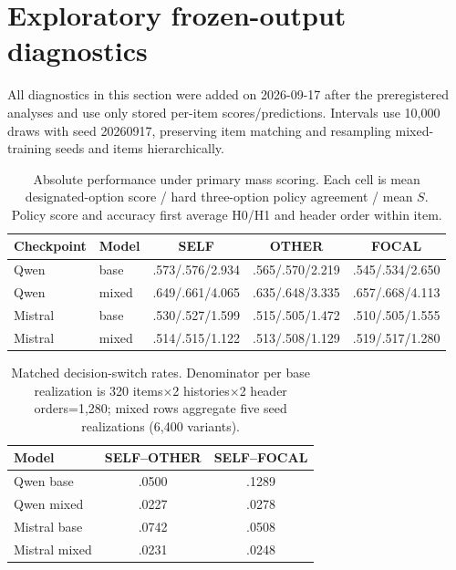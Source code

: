 \documentclass{article}
\begin{document}
\section{Exploratory frozen-output diagnostics}
\label{app:diagnostics}
All diagnostics in this section were added on 2026-09-17 after the preregistered analyses and use only stored per-item scores/predictions. Intervals use 10,000 draws with seed 20260917, preserving item matching and resampling mixed-training seeds and items hierarchically.

\begin{table}[h]
\caption{Absolute performance under primary mass scoring. Each cell is mean designated-option score / hard three-option policy agreement / mean $S$. Policy score and accuracy first average H0/H1 and header order within item.}
\scriptsize
\begin{center}
\begin{tabular}{llccc}
\toprule
Checkpoint & Model & SELF & OTHER & FOCAL \\
\midrule
Qwen & base & .573/.576/2.934 & .565/.570/2.219 & .545/.534/2.650 \\
Qwen & mixed & .649/.661/4.065 & .635/.648/3.335 & .657/.668/4.113 \\
Mistral & base & .530/.527/1.599 & .515/.505/1.472 & .510/.505/1.555 \\
Mistral & mixed & .514/.515/1.122 & .513/.508/1.129 & .519/.517/1.280 \\
\bottomrule
\end{tabular}
\end{center}
\end{table}

\begin{table}[h]
\caption{Matched decision-switch rates. Denominator per base realization is 320 items$\times$2 histories$\times$2 header orders=1,280; mixed rows aggregate five seed realizations (6,400 variants).}
\scriptsize
\begin{center}
\begin{tabular}{lcc}
\toprule
Model & SELF--OTHER & SELF--FOCAL \\
\midrule
Qwen base & .0500 & .1289 \\
Qwen mixed & .0227 & .0278 \\
Mistral base & .0742 & .0508 \\
Mistral mixed & .0231 & .0248 \\
\bottomrule
\end{tabular}
\end{center}
\end{table}
\end{document}
